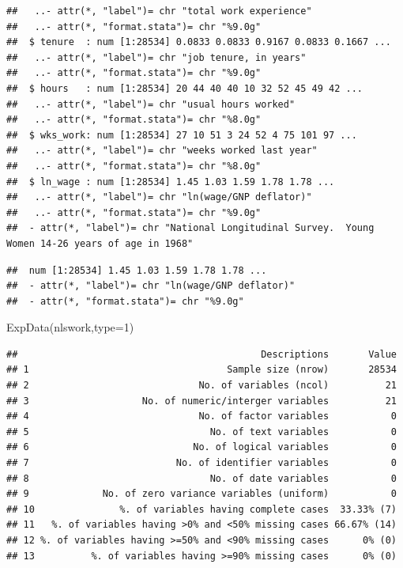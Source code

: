 \documentclass[
]{article}
\newenvironment{Shaded}{\begin{snugshade}}{\end{snugshade}}
\newcommand{\AttributeTok}[1]{\textcolor[rgb]{0.77,0.63,0.00}{#1}}
\newcommand{\CommentTok}[1]{\textcolor[rgb]{0.56,0.35,0.01}{\textit{#1}}}
\newcommand{\DecValTok}[1]{\textcolor[rgb]{0.00,0.00,0.81}{#1}}
\newcommand{\FunctionTok}[1]{\textcolor[rgb]{0.00,0.00,0.00}{#1}}
\newcommand{\NormalTok}[1]{#1}
\newcommand{\SpecialCharTok}[1]{\textcolor[rgb]{0.00,0.00,0.00}{#1}}
\begin{document}
\begin{verbatim}
##   ..- attr(*, "label")= chr "total work experience"
##   ..- attr(*, "format.stata")= chr "%9.0g"
##  $ tenure  : num [1:28534] 0.0833 0.0833 0.9167 0.0833 0.1667 ...
##   ..- attr(*, "label")= chr "job tenure, in years"
##   ..- attr(*, "format.stata")= chr "%9.0g"
##  $ hours   : num [1:28534] 20 44 40 40 10 32 52 45 49 42 ...
##   ..- attr(*, "label")= chr "usual hours worked"
##   ..- attr(*, "format.stata")= chr "%8.0g"
##  $ wks_work: num [1:28534] 27 10 51 3 24 52 4 75 101 97 ...
##   ..- attr(*, "label")= chr "weeks worked last year"
##   ..- attr(*, "format.stata")= chr "%8.0g"
##  $ ln_wage : num [1:28534] 1.45 1.03 1.59 1.78 1.78 ...
##   ..- attr(*, "label")= chr "ln(wage/GNP deflator)"
##   ..- attr(*, "format.stata")= chr "%9.0g"
##  - attr(*, "label")= chr "National Longitudinal Survey.  Young Women 14-26 years of age in 1968"
\end{verbatim}

\begin{Shaded}
\end{Shaded}

\begin{verbatim}
##  num [1:28534] 1.45 1.03 1.59 1.78 1.78 ...
##  - attr(*, "label")= chr "ln(wage/GNP deflator)"
##  - attr(*, "format.stata")= chr "%9.0g"
\end{verbatim}

\begin{Shaded}
\begin{Highlighting}[]
  \FunctionTok{ExpData}\NormalTok{(nlswork,}\AttributeTok{type=}\DecValTok{1}\NormalTok{)}
\end{Highlighting}
\end{Shaded}

\begin{verbatim}
##                                           Descriptions       Value
## 1                                   Sample size (nrow)       28534
## 2                              No. of variables (ncol)          21
## 3                    No. of numeric/interger variables          21
## 4                              No. of factor variables           0
## 5                                No. of text variables           0
## 6                             No. of logical variables           0
## 7                          No. of identifier variables           0
## 8                                No. of date variables           0
## 9             No. of zero variance variables (uniform)           0
## 10               %. of variables having complete cases  33.33% (7)
## 11   %. of variables having >0% and <50% missing cases 66.67% (14)
## 12 %. of variables having >=50% and <90% missing cases      0% (0)
## 13          %. of variables having >=90% missing cases      0% (0)
\end{verbatim}
\end{document}
